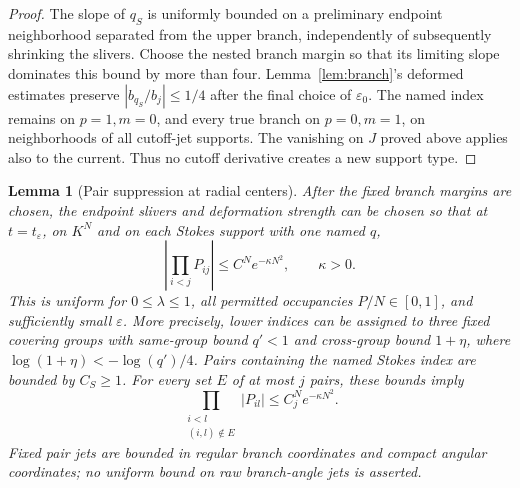 \documentclass[11pt]{article}
\numberwithin{equation}{section}
\newtheorem{lemma}[theorem]{Lemma}
\theoremstyle{definition}
\newcommand{\eps}{\varepsilon}
\begin{document}
\begin{proof}
The slope of \(q_S\) is uniformly bounded on a preliminary
endpoint neighborhood separated from the upper branch, independently
of subsequently shrinking the slivers. Choose the nested branch
margin so that its limiting slope dominates this bound by more
than four. Lemma~\ref{lem:branch}'s deformed estimates preserve
\(|b_{q_S}/b_j|\le1/4\) after the final choice of \(\eps_0\).
The named index remains on \(p=1,m=0\), and every true branch
on \(p=0,m=1\), on neighborhoods of all cutoff-jet supports.
The vanishing on \(J\) proved above applies also to the current.
Thus no cutoff derivative creates a new support type.
\end{proof}

\begin{lemma}[Pair suppression at radial centers]\label{lem:contraction}
After the fixed branch margins are chosen, the endpoint slivers and
deformation strength can be chosen so that at \(t=t_\eps\), on
\(K^N\) and on each Stokes support with one named \(q\),
\[
 \left|\prod_{i<j}P_{ij}\right|\le C^Ne^{-\kappa N^2},
 \qquad \kappa>0 .
\]
This is uniform for \(0\le\lambda\le1\), all permitted occupancies
\(P/N\in[0,1]\), and sufficiently small \(\eps\).
More precisely, lower indices can be assigned to three fixed
covering groups with same-group bound \(q'<1\) and cross-group
bound \(1+\eta\), where \(\log(1+\eta)<-\log(q')/4\).
Pairs containing the named Stokes index are bounded by \(C_S\ge1\).
For every set \(E\) of at most \(j\) pairs, these bounds imply
\[
 \prod_{\substack{i<l\\(i,l)\notin E}}|P_{il}|
       \le C_j^N e^{-\kappa N^2}.
\]
Fixed pair jets are bounded in regular branch coordinates and
compact angular coordinates; no uniform bound on raw branch-angle
jets is asserted.
\end{lemma}
\end{document}
